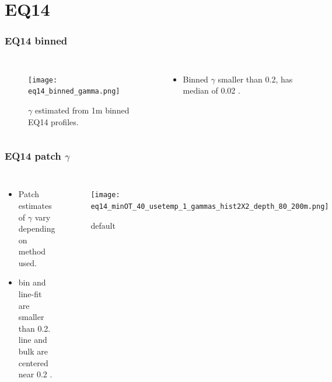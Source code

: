 \documentclass{beamer}
\begin{document}
\section{EQ14}

\begin{frame}
 \frametitle{EQ14 binned}


\begin{columns}
\begin{figure}[htbp]
\begin{center}
\texttt{[image: eq14\_binned\_gamma.png]}
\caption{$\gamma$ estimated from 1m binned EQ14 profiles.}
\label{default}
\end{center}
\end{figure}

\begin{itemize}
\item Binned $\gamma$ smaller than 0.2, has median of 0.02 .
\end{itemize}

\end{columns}

\end{frame}


\begin{frame}
 \frametitle{EQ14 patch $\gamma$}


\begin{columns}
\begin{itemize}
\item Patch estimates of $\gamma$ vary depending on method used.
\item bin and line-fit are smaller than 0.2. line and bulk are centered near 0.2 .
\end{itemize}

\begin{figure}[htbp]
\begin{center}
\texttt{[image: eq14\_minOT\_40\_usetemp\_1\_gammas\_hist2X2\_depth\_80\_200m.png]}
\caption{default}
\label{default}
\end{center}
\end{figure}

\end{columns}



\end{frame}
\end{document}
